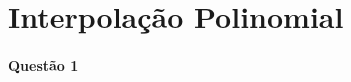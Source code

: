 \documentclass[a4paper,11pt]{article}
\title{\tituloCapa}
\begin{document}


\section{Interpolação Polinomial}


\paragraph{Questão 1}

\end{document}
